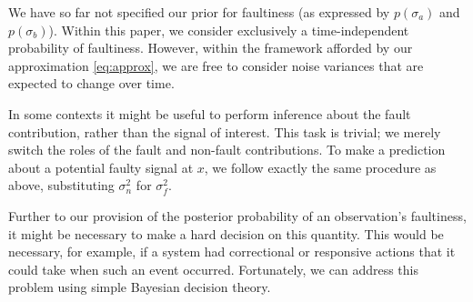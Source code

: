 \documentclass{article}
\begin{document}
We have so far not specified our prior for faultiness (as expressed by $p(\sigma_a)$ and $p(\sigma_b)$). Within this paper, we consider exclusively a time-independent probability of faultiness. However, within the framework afforded by our approximation \eqref{eq:approx}, we are free to consider noise variances that are expected to change over time.

In some contexts it might be useful to perform inference about the
fault contribution, rather than the signal of interest.  
This task is trivial; we merely switch the roles of the fault and non-fault
contributions.  To make a prediction about a potential faulty signal
at $x$, we follow exactly the same procedure as above, substituting
$\sigma_n^2$ for $\sigma_f^2$.

Further to our provision of the posterior probability of an observation's faultiness, it might be necessary to make a hard decision on this quantity. This would be necessary, for
example, if a system had correctional or responsive actions that it
could take when such an event occurred.  Fortunately, we can address
this problem using simple Bayesian decision theory.

\end{document}
